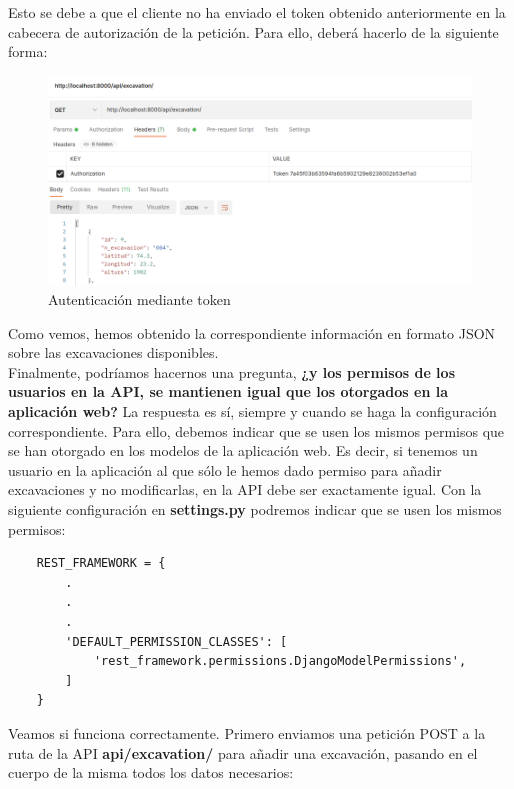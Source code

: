 Esto se debe a que el cliente no ha enviado el token obtenido anteriormente en la
cabecera de autorización de la petición. Para ello, deberá hacerlo de la siguiente
forma:

    \begin{figure}[H]
        \centering
        \includegraphics[scale=0.38]{imagenes/token-auth.png}
        \caption{Autenticación mediante token}
        \label{fig:token-auth}
    \end{figure}

Como vemos, hemos obtenido la correspondiente información en formato JSON sobre las
excavaciones disponibles.\\

Finalmente, podríamos hacernos una pregunta, \textbf{¿y los permisos de los usuarios en la
API, se mantienen igual que los otorgados en la aplicación web?} La respuesta es sí, siempre
y cuando se haga la configuración correspondiente. Para ello, debemos indicar que se usen
los mismos permisos que se han otorgado en los modelos de la aplicación web. Es decir, si
tenemos un usuario en la aplicación al que sólo le hemos dado permiso para añadir excavaciones
y no modificarlas, en la API debe ser exactamente igual. Con la siguiente configuración en
\textbf{settings.py} podremos indicar que se usen los mismos permisos:

    \begin{verbatim}
    REST_FRAMEWORK = {
        .
        .
        .
        'DEFAULT_PERMISSION_CLASSES': [
            'rest_framework.permissions.DjangoModelPermissions',
        ]
    }
    \end{verbatim}

Veamos si funciona correctamente. Primero enviamos una petición POST a la ruta de la API
\textbf{api/excavation/} para añadir una excavación, pasando en el cuerpo de la misma
todos los datos necesarios:

